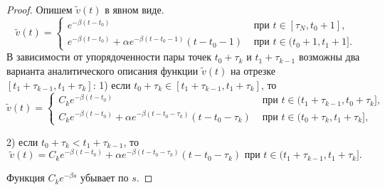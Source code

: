 \begin{proof}
	Опишем $\tilde{v}(t)$ в явном виде.
	\[
	\tilde{v}(t) = 
	\begin{cases}
		e^{-\beta(t-t_0)} & \text{ при } t\in[\tau_N,t_0+1],\\
		e^{-\beta(t-t_0)}+\alpha e^{-\beta (t-t_0-1)} (t-t_0-1) & \text{ при } t\in(t_0+1,t_1+1].
	\end{cases}
	\]
	В зависимости от упорядоченности пары точек $t_0+\tau_k$ и $t_1+\tau_{k-1}$ возможны два варианта аналитического описания функции $\tilde{v}(t)$ на отрезке $[t_1+\tau_{k-1},t_1+\tau_k]$:
	1) если $t_0+\tau_k\in[t_1+\tau_{k-1},t_1+\tau_k]$, то
	\begin{equation}
		\label{eq:v_hair1}
		\tilde{v}(t)=
		\begin{cases}
			C_k e^{-\beta(t-t_0)} & \text{ при } t\in(t_1+\tau_{k-1},t_0+\tau_k],\\
			C_k e^{-\beta(t-t_0)} + \alpha e^{-\beta (t-t_0-\tau_k)} (t-t_0-\tau_k) & \text{ при } t\in(t_0+\tau_k,t_1+\tau_k],
		\end{cases}
	\end{equation}
		
	2) если $t_0+\tau_{k} < t_1+\tau_{k-1}$, то
	\begin{equation}
		\label{eq:v_hair2} 
		\tilde{v}(t)= C_k e^{-\beta(t-t_0)}+\alpha e^{-\beta (t-t_0-\tau_k)} (t-t_0-\tau_k) \text{ при } t\in(t_1+\tau_{k-1},t_1+\tau_k].
	\end{equation}
	
	
	Функция $C_ke^{-\beta s}$ убывает по $s$.
	

\end{proof}
